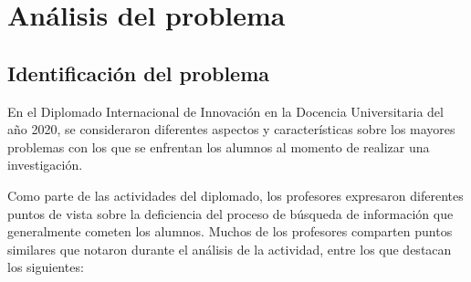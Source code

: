 
\section{Análisis del problema}
\label{AnalisisProblemacapIV}


\subsection{Identificación del problema}
\label{IdentificacionProblemacapIV}

En el Diplomado Internacional de Innovación en la Docencia Universitaria del año 2020, se consideraron diferentes aspectos y características sobre los mayores problemas con los que se enfrentan los alumnos al momento de realizar una investigación.

Como parte de las actividades del diplomado, los profesores expresaron diferentes puntos de vista sobre la deficiencia del proceso de búsqueda de información que generalmente cometen los alumnos. Muchos de los profesores comparten puntos similares que notaron durante el análisis de la actividad, entre los que destacan los siguientes:

